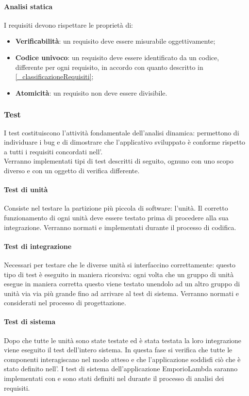 \paragraph{Analisi statica}
I requisiti devono rispettare le proprietà di:
\begin{itemize}
    \item \textbf{Verificabilità}: un requisito deve essere misurabile oggettivamente;
    \item \textbf{Codice univoco}: un requisito deve essere identificato da un codice, differente per ogni requisito, in accordo con quanto descritto in \ref{_classificazioneRequisiti};
    \item \textbf{Atomicità}: un requisito non deve essere divisibile.
\end{itemize}

\subsubsection{Test}
I test costituiscono l'attività fondamentale dell'analisi dinamica: permettono di individuare i bug e di dimostrare che l'applicativo sviluppato è conforme rispetto a tutti i requisiti concordati nell'.\\
Verranno implementati tipi di test descritti di seguito, ognuno con uno scopo diverso e con un oggetto di verifica differente.
\paragraph{Test di unità}
Consiste nel testare la partizione più piccola di software: l'unità. Il corretto funzionamento di ogni unità deve essere testato prima di procedere alla sua integrazione.
Verranno normati e implementati durante il processo di codifica.

\paragraph{Test di integrazione}
Necessari per testare che le diverse unità si interfaccino correttamente: questo tipo di test è eseguito in maniera ricorsiva: ogni volta che un gruppo di unità esegue in maniera corretta questo viene testato unendolo ad un altro gruppo di unità via via più grande fino ad arrivare al test di sistema.
Verranno normati e considerati nel processo di progettazione.

\paragraph{Test di sistema}
Dopo che tutte le unità sono state testate ed è stata testata la loro integrazione viene eseguito il test dell'intero sistema. In questa fase si verifica che tutte le componenti interagiscano nel modo atteso e che l'applicazione soddisfi ciò che è stato definito nell'.
I test di sistema dell'applicazione EmporioLambda saranno implementati con  e sono stati definiti nel  durante il processo di analisi dei requisiti.

